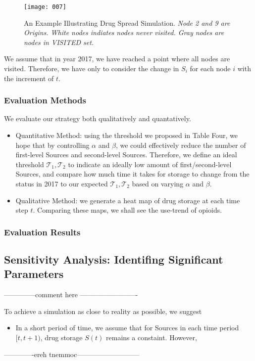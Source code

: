 \begin{figure}[H]
	\centering
	\texttt{[image: 007]}
	\caption{An Example Illustrating Drug Spread Simulation. \textit{Node 2 and 9 are Origins. White nodes indiates nodes never visited. Gray nodes are nodes in VISITED set.}}
\end{figure}

We assume that in year 2017, we have reached a point where all nodes are visited. Therefore, we have only to consider the change in $S_i$ for each node $i$ with the increment of $t$. 

\subsubsection{Evaluation Methods}
We evaluate our strategy both qualitatively and quantatively. 
\begin{itemize}
	\item Quantitative Method: using the threshold we proposed in Table Four, we hope that by controlling $\alpha$ and $\beta$, we could effectively reduce the number of first-level Sources and second-level Sources. Therefore, we define an ideal threshold $\mathcal{T}_1, \mathcal{T}_2$ to indicate an ideally low amount of first/second-level Sources, and compare how much time it takes for storage to change from the status in 2017 to our expected $\mathcal{T}_1, \mathcal{T}_2$ based on varying $\alpha$ and $\beta$. 
	
	\item Qualitative Method: we generate a heat map of drug storage at each time step $t$. Comparing these maps, we shall see the use-trend of opioids.
\end{itemize}

\subsubsection{Evaluation Results}

\subsection{Sensitivity Analysis: Identifing Significant Parameters}

--------------comment here -------------------------

To achieve a simulation as close to reality as possible, we suggest
\begin{itemize}
	\item In a short period of time, we assume that for Sources in each time period $[t,t+1)$, drug storage $S(t)$ remains a constaint. However,  
\end{itemize}

-------------ereh tnemmoc---------------------------